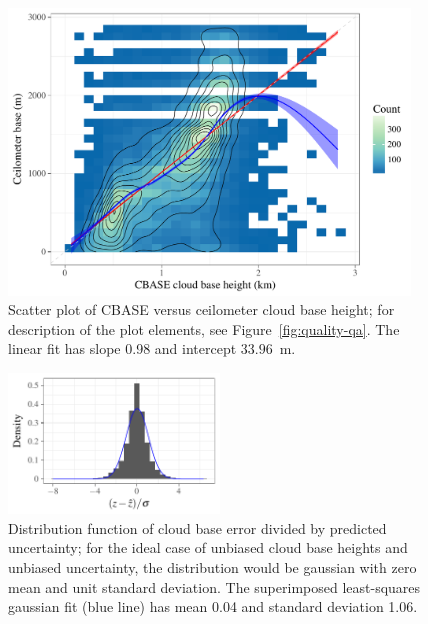 \documentclass[amt,manuscript]{copernicus}\usepackage[]{graphicx}\usepackage[]{color}
\newenvironment{knitrout}{}{} %
\begin{document}
\begin{figure}
  \centering
\begin{knitrout}
\color{fgcolor}

{\centering \includegraphics[width=0.95\textwidth]{figure/method-combo-plot-1} 

}



\end{knitrout}
  \caption{Scatter plot of CBASE versus ceilometer cloud base height; for
    description of the plot elements, see Figure~\ref{fig:quality-qa}.  The
    linear fit has slope 0.98 and intercept
    $33.96$~m.}
  \label{fig:eval}
\end{figure}

\begin{figure}
  \centering
\begin{knitrout}
\color{fgcolor}

{\centering \includegraphics[width=0.5\textwidth]{figure/method-combo-eval-pull-1} 

}



\end{knitrout}
  \caption{Distribution function of cloud base error divided by predicted
    uncertainty; for the ideal case of unbiased cloud base heights and unbiased
    uncertainty, the distribution would be gaussian with zero mean and unit
    standard deviation.  The superimposed least-squares gaussian fit (blue line)
    has mean 0.04 and
    standard deviation 1.06.}
  \label{fig:pull}
\end{figure}
\end{document}
